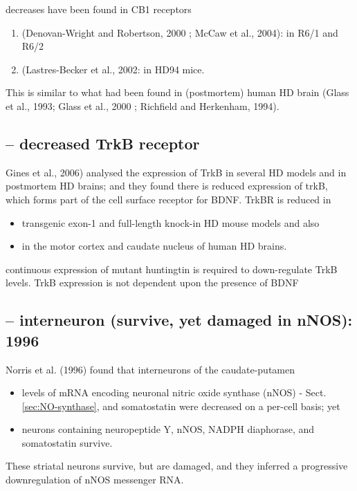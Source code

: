 decreases have been found in CB1 receptors 
\begin{enumerate}
  \item   (Denovan-Wright and Robertson, 2000 ;  McCaw et al., 2004): 
   in R6/1 and R6/2 
   
  \item  (Lastres-Becker et al., 2002: in HD94 mice. 
\end{enumerate}

This is similar to what had been found in (postmortem) human HD brain (Glass et
al., 1993; Glass et al., 2000 ; Richfield and Herkenham, 1994).

\subsection{-- decreased TrkB receptor}

Gines et al., 2006)  analysed the expression of TrkB in several HD models and in
postmortem HD brains; and they  found there is reduced expression of trkB, which
forms part of the cell surface receptor for BDNF.
TrkBR is reduced in
\begin{itemize}
  \item transgenic exon-1 and full-length knock-in HD mouse models and also 
  
  \item in the motor cortex and caudate nucleus of human HD brains. 
\end{itemize}
continuous expression of mutant huntingtin is required to down-regulate TrkB
levels. TrkB expression is not dependent upon the presence of BDNF



\subsection{-- interneuron (survive, yet damaged in nNOS): 1996}

Norris et al. (1996) found that  interneurons of the caudate-putamen
\begin{itemize}
  \item  levels of mRNA encoding neuronal nitric oxide synthase (nNOS) -
  Sect.\ref{sec:NO-synthase}, and somatostatin were decreased on a per-cell
  basis; yet
  
  \item  neurons containing neuropeptide Y, nNOS, NADPH diaphorase, and
  somatostatin survive.
\end{itemize}
These striatal neurons survive, but are damaged, and they inferred a
progressive downregulation of nNOS messenger RNA.


